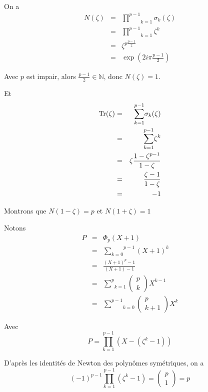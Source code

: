 \

 On a
\begin{eqnarray*}
  N (\zeta) & = & \underset{k = 1}{\overset{p - 1}{\prod}} \sigma_k (\zeta)\\
  & = & \underset{k = 1}{\overset{p - 1}{\prod}} \zeta^k\\
  & = & \zeta^{p \frac{p - 1}{2}}\\
  & = & \exp \left( 2 i \pi \frac{p - 1}{2} \right)
\end{eqnarray*}


Avec $p$ est impair, alors $\frac{p - 1}{2} \in \mathbb{N}$, donc $N (\zeta) =
1$.

Et
\begin{eqnarray*}
  \operatorname{Tr} (\zeta) & = & \underset{k = 1}{\overset{p - 1}{\sum}} \sigma_k
  (\zeta)\\
  & = & \underset{k = 1}{\overset{p - 1}{\sum}} \zeta^k\\
  & = & \zeta \frac{1 - \zeta^{p - 1}}{1 - \zeta}\\
  & = & \frac{\zeta - 1}{1 - \zeta}\\
  & = & - 1
\end{eqnarray*}


 Montrons que $N (1 - \zeta) = p$ et $N (1 + \zeta) = 1$

Notons
\begin{eqnarray*}
  P & = & \Phi_p (X + 1)\\
  & = & \overset{p - 1}{\underset{k = 0}{\sum}} (X + 1)^k\\
  & = & \frac{(X + 1)^p - 1}{(X + 1) - 1}\\
  & = & \underset{k = 1}{\overset{p}{\sum}} \left( \begin{array}{c}
    p\\
    k
  \end{array} \right) X^{k - 1}\\
  & = & \underset{k = 0}{\overset{p - 1}{\sum}} \left( \begin{array}{c}
    p\\
    k + 1
  \end{array} \right) X^k
\end{eqnarray*}


Avec
\[ P = \underset{k = 1}{\overset{p - 1}{\prod}} (X - (\zeta^k - 1)) \]


D'apr{\`e}s les identit{\'e}s de Newton des polyn{\^o}mes sym{\'e}triques, on
a
\[ (- 1)^{p - 1} \prod^{p - 1}_{k = 1} (\zeta^k - 1) = \left( \begin{array}{c}
     p\\
     1
   \end{array} \right) = p \]


